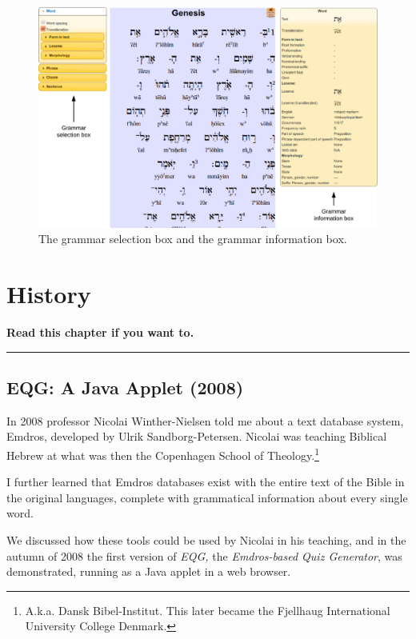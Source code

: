 \documentclass[11pt,oneside,a4paper]{memoir}
\begin{document}
\begin{figure}[h]
\includegraphics[width=\textwidth]{grammarboxes.png}
\caption{The grammar selection box and
  the grammar information box.}\label{fig-grammar-info}
\end{figure}


\chapter{History}

\textbf{Read this chapter if you want to.}
\plainbreak{3}


\section{EQG: A Java Applet (2008)}

In 2008 professor Nicolai Winther-Nielsen told me about a text
database system, Emdros, developed by Ulrik Sandborg-Petersen.
Nicolai was teaching Biblical Hebrew at what was then the Copenhagen School of
Theology.\footnote{A.k.a. Dansk Bibel-Institut. This later became the Fjellhaug International
  University College Denmark.}

I further learned that Emdros databases exist with the entire text of the Bible in the original
languages, complete with grammatical information about every single word.

We discussed how these tools could be used by Nicolai in his teaching, and in the autumn of 2008 the
first version of \emph{EQG,} the \emph{Emdros-based Quiz Generator}, was demonstrated, running as a Java
applet in a web browser.
\end{document}
